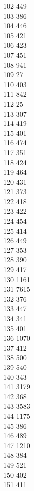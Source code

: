 { 102	449 \\
 103	386 \\
 104	446 \\
 105	421 \\
 106	423 \\
 107	451 \\
 108	941 \\
 109	27 \\
 110	403 \\
 111	842 \\
 112	25 \\
 113	307 \\
 114	419 \\
 115	401 \\
 116	474 \\
 117	351 \\
 118	424 \\
 119	464 \\
 120	431 \\
 121	373 \\
 122	418 \\
 123	422 \\
 124	454 \\
 125	414 \\
 126	449 \\
 127	353 \\
 128	390 \\
 129	417 \\
 130	1161 \\
 131	7615 \\
 132	376 \\
 133	447 \\
 134	341 \\
 135	401 \\
 136	1070 \\
 137	412 \\
 138	500 \\
 139	540 \\
 140	343 \\
 141	3179 \\
 142	368 \\
 143	3583 \\
 144	1175 \\
 145	386 \\
 146	489 \\
 147	1210 \\
 148	384 \\
 149	521 \\
 150	402 \\
 151	411 \\
}
